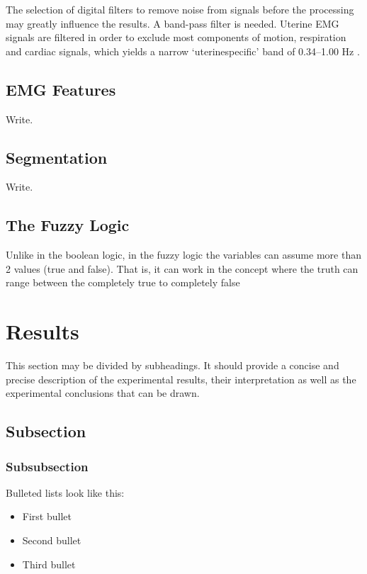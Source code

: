 \documentclass[bioengineering,article,submit,moreauthors,pdftex,10pt,a4paper]{mdpi}
\begin{document}
The selection of digital filters to remove noise from signals before the processing may greatly influence the results. A band-pass filter is needed.  Uterine EMG signals are filtered in order to exclude most components of motion, respiration and cardiac signals, which yields a narrow ‘uterinespecific’ band of 0.34–1.00 Hz \cite{ref-lucovnik}.



\subsection{EMG Features}

Write.


\subsection{Segmentation}

Write.



\subsection{The Fuzzy Logic}

Unlike in the boolean logic, in the fuzzy logic the variables can assume more than 2 values (true and false). That is, it can work in the concept where the truth can range between the completely true to completely false \cite{ref-novak}


 
\section{Results}

This section may be divided by subheadings. It should provide a concise and precise description of the experimental results, their interpretation as well as the experimental conclusions that can be drawn.


\subsection{Subsection}

\subsubsection{Subsubsection}

Bulleted lists look like this:
\begin{itemize}[leftmargin=*,labelsep=5.8mm]
\item	First bullet
\item	Second bullet
\item	Third bullet
\end{itemize}
\end{document}
